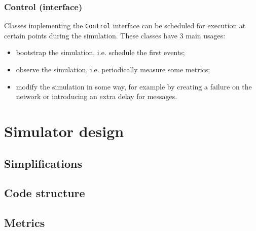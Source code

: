 \subsubsection{Control (interface)}
Classes implementing the \texttt{Control} interface can be scheduled for execution at certain points during the simulation.
These classes have \num{3} main usages:
\begin{itemize}
	\item bootstrap the simulation, i.e. schedule the first events;
	\item observe the simulation, i.e. periodically measure some metrics;
	\item modify the simulation in some way, for example by creating a failure on the network or introducing an extra delay for messages.
\end{itemize}


\section{Simulator design}

\subsection{Simplifications}

\subsection{Code structure}

\subsection{Metrics}
